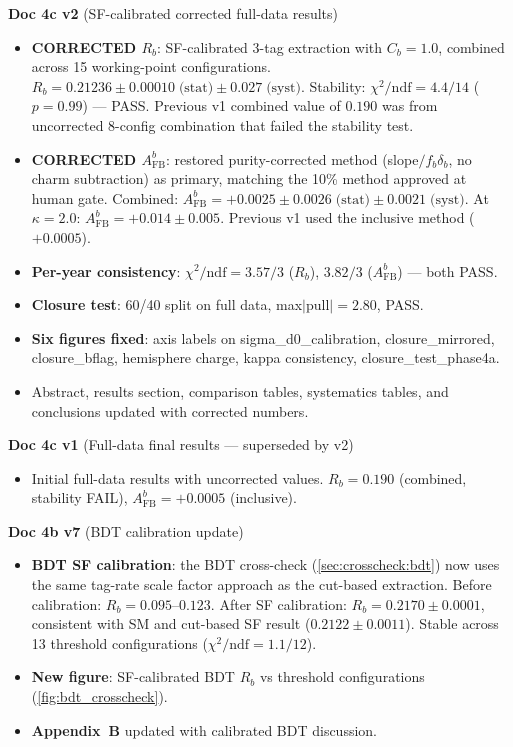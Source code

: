 \documentclass[11pt,a4paper]{article}
\begin{document}
\textbf{Doc 4c v2} (SF-calibrated corrected full-data results)
\begin{itemize}
\item \textbf{CORRECTED $R_b$}: SF-calibrated 3-tag extraction with $C_b = 1.0$,
  combined across 15 working-point configurations.
  $R_b = 0.21236 \pm 0.00010\;\text{(stat)} \pm 0.027\;\text{(syst)}$.
  Stability: $\chi^2/\text{ndf} = 4.4/14$ ($p = 0.99$) --- PASS.
  Previous v1 combined value of $0.190$ was from uncorrected 8-config
  combination that failed the stability test.
\item \textbf{CORRECTED $A_\text{FB}^b$}: restored purity-corrected method
  (slope$/f_b \delta_b$, no charm subtraction) as primary, matching
  the 10\% method approved at human gate.
  Combined: $A_\text{FB}^b = +0.0025 \pm 0.0026\;\text{(stat)}
  \pm 0.0021\;\text{(syst)}$.
  At $\kappa = 2.0$: $A_\text{FB}^b = +0.014 \pm 0.005$.
  Previous v1 used the inclusive method ($+0.0005$).
\item \textbf{Per-year consistency}: $\chi^2/\text{ndf} = 3.57/3$ ($R_b$),
  $3.82/3$ ($A_\text{FB}^b$) --- both PASS.
\item \textbf{Closure test}: 60/40 split on full data, max$|$pull$| = 2.80$, PASS.
\item \textbf{Six figures fixed}: axis labels on sigma\_d0\_calibration,
  closure\_mirrored, closure\_bflag, hemisphere charge, kappa consistency,
  closure\_test\_phase4a.
\item Abstract, results section, comparison tables, systematics tables,
  and conclusions updated with corrected numbers.
\end{itemize}

\textbf{Doc 4c v1} (Full-data final results --- superseded by v2)
\begin{itemize}
\item Initial full-data results with uncorrected values.
  $R_b = 0.190$ (combined, stability FAIL), $A_\text{FB}^b = +0.0005$ (inclusive).
\end{itemize}

\textbf{Doc 4b v7} (BDT calibration update)
\begin{itemize}
\item \textbf{BDT SF calibration}: the BDT cross-check (\cref{sec:crosscheck:bdt})
  now uses the same tag-rate scale factor approach as the cut-based extraction.
  Before calibration: $R_b = 0.095$--$0.123$.
  After SF calibration: $R_b = 0.2170 \pm 0.0001$, consistent with SM and
  cut-based SF result ($0.2122 \pm 0.0011$).
  Stable across 13 threshold configurations ($\chi^2/\text{ndf} = 1.1/12$).
\item \textbf{New figure}: SF-calibrated BDT $R_b$ vs threshold configurations
  (\cref{fig:bdt_crosscheck}).
\item \textbf{Appendix~B} updated with calibrated BDT discussion.
\end{itemize}
\end{document}
